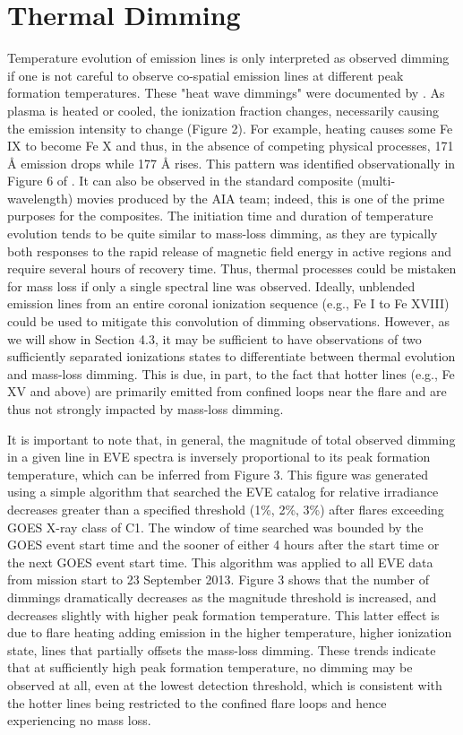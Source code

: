 \section{Thermal Dimming}
Temperature evolution of emission lines is only interpreted as observed dimming if one is not careful to observe co-spatial emission lines at different peak formation temperatures. These "heat wave dimmings" were documented by   \citet{Robbrecht2010}. As plasma is heated or cooled, the ionization fraction changes, necessarily causing the emission intensity to change (Figure 2). For example, heating causes some Fe IX to become Fe X and thus, in the absence of competing physical processes, 171 Å emission drops while 177 Å rises. This pattern was identified observationally in Figure 6 of \citet{Woods2011}. It can also be observed in the standard composite (multi-wavelength) movies produced by the AIA team; indeed, this is one of the prime purposes for the composites. The initiation time and duration of temperature evolution tends to be quite similar to mass-loss dimming, as they are typically both responses to the rapid release of magnetic field energy in active regions and require several hours of recovery time. Thus, thermal processes could be mistaken for mass loss if only a single spectral line was observed. Ideally, unblended emission lines from an entire coronal ionization sequence (e.g., Fe I to Fe XVIII) could be used to mitigate this convolution of dimming observations. However, as we will show in Section 4.3, it may be sufficient to have observations of two sufficiently separated ionizations states to differentiate between thermal evolution and mass-loss dimming. This is due, in part, to the fact that hotter lines (e.g., Fe XV and above) are primarily emitted from confined loops near the flare and are thus not strongly impacted by mass-loss dimming. 

It is important to note that, in general, the magnitude of total observed dimming in a given line in EVE spectra is inversely proportional to its peak formation temperature, which can be inferred from Figure 3. This figure was generated using a simple algorithm that searched the EVE catalog for relative irradiance decreases greater than a specified threshold (1\%, 2\%, 3\%) after flares exceeding GOES X-ray class of C1. The window of time searched was bounded by the GOES event start time and the sooner of either 4 hours after the start time or the next GOES event start time. This algorithm was applied to all EVE data from mission start to 23 September 2013. Figure 3 shows that the number of dimmings dramatically decreases as the magnitude threshold is increased, and decreases slightly with higher peak formation temperature. This latter effect is due to flare heating adding emission in the higher temperature, higher ionization state, lines that partially offsets the mass-loss dimming. These trends indicate that at sufficiently high peak formation temperature, no dimming may be observed at all, even at the lowest detection threshold, which is consistent with the hotter lines being restricted to the confined flare loops and hence experiencing no mass loss. 

